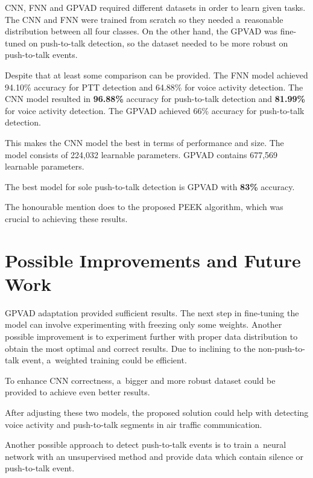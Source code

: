     CNN, FNN and GPVAD required different datasets in order to learn given tasks. The CNN and FNN were trained from scratch so they needed a~reasonable distribution between all four classes. On the other hand, the GPVAD was fine-tuned on push-to-talk detection, so the dataset needed to be more robust on push-to-talk events. 

    Despite that at least some comparison can be provided. The FNN model achieved 94.10\% accuracy for PTT detection and 64.88\% for voice activity detection. The CNN model resulted in \textbf{96.88\%} accuracy for push-to-talk detection and \textbf{81.99\%} for voice activity detection. The GPVAD achieved 66\% accuracy for push-to-talk detection. 

    This makes the CNN model the best in terms of performance and size. The model consists of 224,032 learnable parameters. GPVAD contains 677,569 learnable parameters. 

    The best model for sole push-to-talk detection is GPVAD with \textbf{83\%} accuracy. 

    The honourable mention does to the proposed PEEK algorithm, which was crucial to achieving these results. 
 
    
\section{Possible Improvements and Future Work}\label{improvements}

    GPVAD adaptation provided sufficient results. The next step in fine-tuning the model can involve experimenting with freezing only some weights. Another possible improvement is to experiment further with proper data distribution to obtain the most optimal and correct results.
    Due to inclining to the non-push-to-talk event, a~weighted training could be efficient. 

    To enhance CNN correctness, a~bigger and more robust dataset could be provided to achieve even better results. 

    After adjusting these two models, the proposed solution could help with detecting voice activity and push-to-talk segments in air traffic communication. 
    
    Another possible approach to detect push-to-talk events is to train a~neural network with an unsupervised method and provide data which contain silence or push-to-talk event. 


